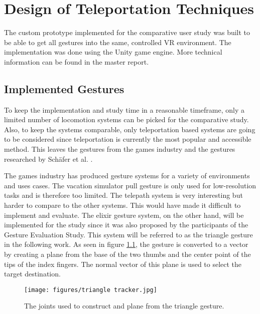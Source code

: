 \chapter{Design of Teleportation Techniques}
\label{cha:ImplementationOverview}

The custom prototype implemented for the comparative user study was built to be able to get all gestures into the same, controlled VR environment. The implementation was done using the Unity game engine. More technical information can be found in the master report. 

\section{Implemented Gestures}

To keep the implementation and study time in a reasonable timeframe, only a limited number of locomotion systems can be picked for the comparative study. Also, to keep the systems comparable, only teleportation based systems are going to be considered since teleportation is currently the most popular and accessible method. This leaves the gestures from the games industry and the gestures researched by Schäfer et al. \cite{Schafer2021}. 

The games industry has produced gesture systems for a variety of environments and uses cases. The vacation simulator pull gesture is only used for low-resolution tasks and is therefore too limited. The telepath system is very interesting but harder to compare to the other systems. This would have made it difficult to implement and evaluate. %
The elixir gesture system, on the other hand, will be implemented for the study since it was also proposed by the participants of the Gesture Evaluation Study.  %
This system will be referred to as the triangle gesture in the following work. As seen in figure \ref{fig:triangleTracker}, the gesture is converted to a vector by creating a plane from the base of the two thumbs and the center point of the tips of the index fingers. The normal vector of this plane is used to select the target destination.

\begin{figure}[!ht]
    \centering
    \texttt{[image: figures/triangle tracker.jpg]}
    \caption{The joints used to construct and plane from the triangle gesture.}
    \label{fig:triangleTracker}
\end{figure}

